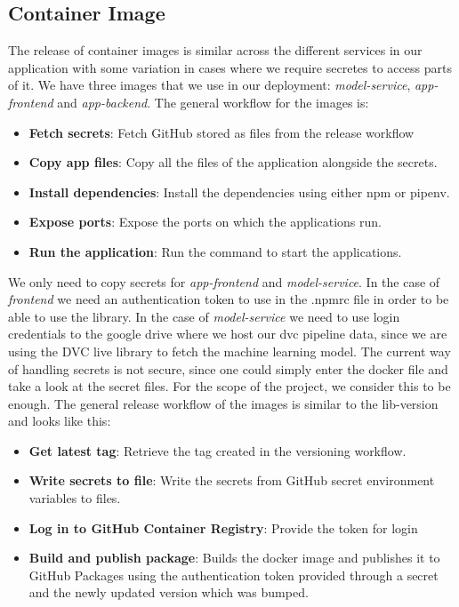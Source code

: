 \subsection{Container Image}
The release of container images is similar across the different services in our application with some variation in cases where we require secretes to access parts of it. We have three images that we use in our deployment: \emph{model-service}, \emph{app-frontend} and \emph{app-backend}. The general workflow for the images is:
\begin{itemize}
    \item \textbf{Fetch secrets}: Fetch GitHub stored as files from the release workflow
    \item \textbf{Copy app files}: Copy all the files of the application alongside the secrets.
    \item \textbf{Install dependencies}: Install the dependencies using either npm or pipenv.
    \item \textbf{Expose ports}: Expose the ports on which the applications run.
    \item \textbf{Run the application}: Run the command to start the applications.
\end{itemize}
We only need to copy secrets for \emph{app-frontend} and \emph{model-service}. In the case of \emph{frontend} we need an authentication token to use in the .npmrc file in order to be able to use the library. In the case of \emph{model-service} we need to use login credentials to the google drive where we host our dvc pipeline data, since we are using the DVC live library to fetch the machine learning model. The current way of handling secrets is not secure, since one could simply enter the docker file and take a look at the secret files. For the scope of the project, we consider this to be enough. The general release workflow of the images is similar to the lib-version and looks like this:
\begin{itemize}
    \item \textbf{Get latest tag}: Retrieve the tag created in the versioning workflow.
    \item \textbf{Write secrets to file}: Write the secrets from GitHub secret environment variables to files.
    \item \textbf{Log in to GitHub Container Registry}: Provide the token for login
    \item \textbf{Build and publish package}: Builds the docker image and publishes it to GitHub Packages using the authentication token provided through a secret and the newly updated version which was bumped.
\end{itemize}